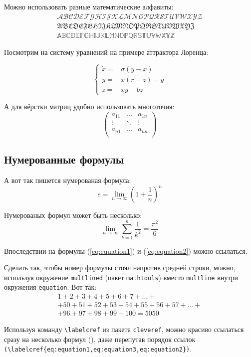 Можно использовать разные математические алфавиты:
\begin{align}
\mathcal{ABCDEFGHIJKLMNOPQRSTUVWXYZ} \nonumber \\
\mathfrak{ABCDEFGHIJKLMNOPQRSTUVWXYZ} \nonumber \\
\mathbb{ABCDEFGHIJKLMNOPQRSTUVWXYZ} \nonumber
\end{align}

Посмотрим на систему уравнений на примере аттрактора Лоренца:

\[ 
\left\{
  \begin{array}{rl}
    \dot x = & \sigma (y-x) \\
    \dot y = & x (r - z) - y \\
    \dot z = & xy - bz
  \end{array}
\right.
\]

А для вёрстки матриц удобно использовать многоточия:
\[ 
\left(
  \begin{array}{ccc}
    a_{11} & \ldots & a_{1n} \\
    \vdots & \ddots & \vdots \\
    a_{n1} & \ldots & a_{nn} \\
  \end{array}
\right)
\]


\subsection{Нумерованные формулы} \label{subsect1_3_3}

А вот так пишется нумерованая формула:
\begin{equation}
  \label{eq:equation1}
  e = \lim_{n \to \infty} \left( 1+\frac{1}{n} \right) ^n
\end{equation}

Нумерованых формул может быть несколько:
\begin{equation}
  \label{eq:equation2}
  \lim_{n \to \infty} \sum_{k=1}^n \frac{1}{k^2} = \frac{\pi^2}{6}
\end{equation}

Впоследствии на формулы (\ref{eq:equation1}) и (\ref{eq:equation2}) можно ссылаться.

Сделать так, чтобы номер формулы стоял напротив средней строки, можно, используя окружение \verb|multlined| (пакет \verb|mathtools|) вместо \verb|multline| внутри окружения \verb|equation|. Вот так:
\begin{equation} %
  \label{eq:equation3}
    \begin{multlined}
        1+ 2+3+4+5+6+7+\dots + \\ 
        + 50+51+52+53+54+55+56+57 + \dots + \\ 
        + 96+97+98+99+100=5050 
    \end{multlined}
\end{equation}

Используя команду \verb|\labelcref| из пакета \verb|cleveref|, можно
красиво ссылаться сразу на несколько формул
(), даже перепутав
порядок ссылок \verb|(\labelcref{eq:equation1,eq:equation3,eq:equation2})|.

